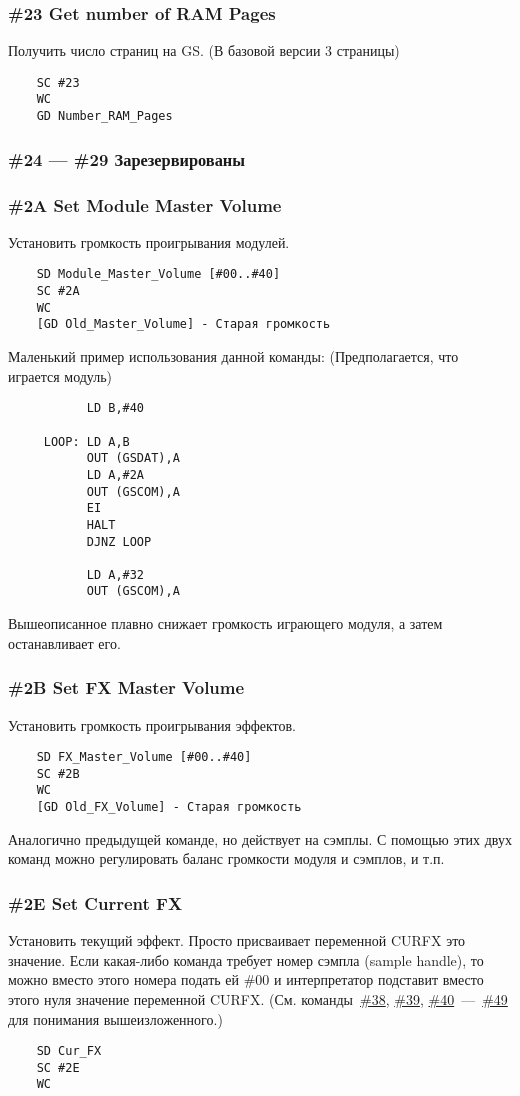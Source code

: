 \documentclass[a4paper,11pt]{article}
\begin{document}
\subsubsection{\#23 Get number of RAM Pages}
Получить число страниц на  GS. (В базовой версии 3 страницы)
\begin{verbatim}
    SC #23
    WC
    GD Number_RAM_Pages
\end{verbatim}

\subsubsection{\#24 --- \#29 Зарезервированы}
\subsubsection{\#2A Set Module Master Volume}
Установить громкость проигрывания модулей.
\begin{verbatim}
    SD Module_Master_Volume [#00..#40]
    SC #2A
    WC
    [GD Old_Master_Volume] - Старая громкость
\end{verbatim}

Маленький пример использования данной команды:
(Предполагается, что играется модуль)
\begin{verbatim}
           LD B,#40

     LOOP: LD A,B
           OUT (GSDAT),A
           LD A,#2A
           OUT (GSCOM),A
           EI
           HALT
           DJNZ LOOP

           LD A,#32
           OUT (GSCOM),A
\end{verbatim}

Вышеописанное плавно снижает громкость играющего модуля, а затем останавливает его.

\subsubsection{\#2B Set FX Master Volume}
Установить громкость проигрывания эффектов.
\begin{verbatim}
    SD FX_Master_Volume [#00..#40]
    SC #2B
    WC
    [GD Old_FX_Volume] - Старая громкость
\end{verbatim}

Аналогично предыдущей команде, но действует на сэмплы.
С помощью этих двух команд можно регулировать баланс громкости модуля и сэмплов, и т.п.

\subsubsection{\#2E Set Current FX\label{cmd:2E}}
Установить текущий эффект. Просто присваивает переменной CURFX это значение.
Если какая-либо команда требует номер сэмпла (sample handle), то можно вместо этого номера подать ей \#00 и интерпретатор подставит вместо этого нуля значение переменной CURFX.
(См. команды~\hyperref[cmd:38]{\#38}, \hyperref[cmd:39]{\#39}, \hyperref[cmd:40]{\#40}~---~\hyperref[cmd:49]{\#49} для понимания вышеизложенного.)
\begin{verbatim}
    SD Cur_FX
    SC #2E
    WC
\end{verbatim}
\end{document}
